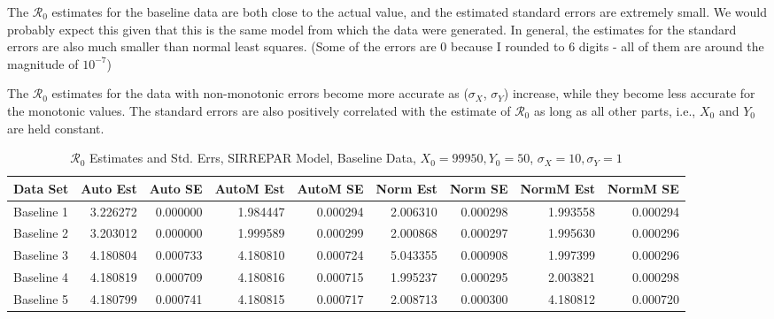 \documentclass[12pt]{article}
\newcommand{\rr}{\ensuremath{\mathcal{R}_0}}
\begin{document}
The $\rr$ estimates for the baseline data are both close to the actual value, and the estimated standard errors are extremely small. We would probably expect this given that this is the same model from which the data were generated. In general, the estimates for the standard errors are also much smaller than normal least squares. (Some of the errors are 0 because I rounded to 6 digits - all of them are around the magnitude of $10 ^ {-7}$)

The $\rr$ estimates for the data with non-monotonic errors become more accurate as ($\sigma_X$, $\sigma_Y$) increase, while they become less accurate for the monotonic values. The standard errors are also positively correlated with the estimate of $\rr$ as long as all other parts, i.e., $X_0$ and $Y_0$ are held constant.

\begin{table}[H]
	
	\caption{$\rr$ Estimates and Std. Errs, SIRREPAR Model,
		Baseline Data, $X_0 = 99950, Y_0 = 50$, 
		$\sigma_X = 10, \sigma_Y = 1$}
	\begin{footnotesize}
		\hskip -1cm
		\begin{tabular}{l|r|r|r|r|r|r|r|r}
			\hline
			Data Set & Auto Est & Auto SE & AutoM Est & AutoM SE & Norm Est & Norm SE & NormM Est & NormM SE\\
			\hline
			Baseline 1 & 3.226272 & 0.000000 & 1.984447 & 0.000294 & 2.006310 & 0.000298 & 1.993558 & 0.000294\\
			\hline
			Baseline 2 & 3.203012 & 0.000000 & 1.999589 & 0.000299 & 2.000868 & 0.000297 & 1.995630 & 0.000296\\
			\hline
			Baseline 3 & 4.180804 & 0.000733 & 4.180810 & 0.000724 & 5.043355 & 0.000908 & 1.997399 & 0.000296\\
			\hline
			Baseline 4 & 4.180819 & 0.000709 & 4.180816 & 0.000715 & 1.995237 & 0.000295 & 2.003821 & 0.000298\\
			\hline
			Baseline 5 & 4.180799 & 0.000741 & 4.180815 & 0.000717 & 2.008713 & 0.000300 & 4.180812 & 0.000720\\
			\hline
		\end{tabular}
	\end{footnotesize}
\end{table}
\end{document}
